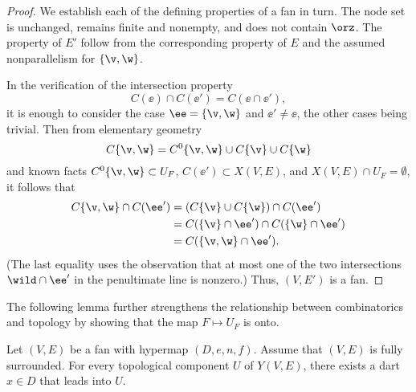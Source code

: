 \begin{proof} We establish each of the defining properties of a fan in
  turn.  The node set is unchanged,  remains finite and nonempty,
  and does not contain $\orz$.  The property  of
  $E'$ follow from the corresponding property of $E$ and the assumed
  nonparallelism for $\{\v,\w\}$.

In the verification of the intersection property
\[ 
C(\ee)\cap C(\ee') = C(\ee \cap \ee'),
\] 
it is enough to consider the case $\ee = \{\v,\w\}$ and $\ee' \ne
\ee$, the other cases being trivial.  Then from elementary geometry 
\[ 
C\{\v,\w\} = C^0\{\v,\w\}\cup C\{\v\}\cup C\{\w\}
\] 
and
known facts
$C^0\{\v,\w\}\subset U_F$, $C(\ee')\subset X(V,E)$, and $X(V,E)\cap
U_F=\emptyset$, it follows that
\begin{align*}
C\{\v,\w\} \cap C(\ee')  &= (C\{\v\} \cup C\{\w\}) \cap C(\ee') \\
&= C(\{\v\}\cap \ee') \cap C(\{\w\}\cap \ee')\\
&= C(\{\v,\w\}\cap \ee').
\end{align*}
(The last equality uses the observation that at most one of the two
intersections $\wild\cap\ee'$ in the penultimate line is nonzero.)
Thus, $(V,E')$ is a fan.
\end{proof}

The following lemma further strengthens the relationship between
combinatorics and topology by showing that the map $F\mapsto U_F$
is onto.

\begin{lemma}[]\label{lemma:lead-exists}
Let $(V,E)$ be a fan with hypermap $(D,e,n,f)$. %
Assume that $(V,E)$ is fully surrounded.  For every
topological component $U$ of $Y(V,E)$, there exists a dart $x\in D$ that
leads into $U$.
\end{lemma}
%
%
%

